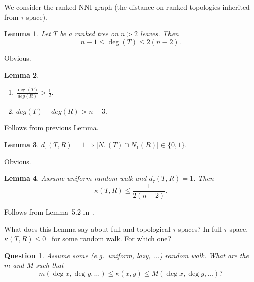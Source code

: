 \documentclass[12pt]{article}
\newtheorem{lemma}{Lemma}
\newtheorem{question}{Question}
\begin{document}
We consider the ranked-NNI graph (the distance on ranked topologies inherited from $\tau$-space). 

\begin{lemma}
Let $T$ be a ranked tree on $n>2$ leaves. Then \[n-1\leq \deg(T)\leq2(n-2).\] 
\end{lemma}

\proof
Obvious. 
\endproof

\begin{lemma}
\begin{enumerate}[(1)]
\item $\frac{\deg(T)}{deg(R)}>\frac12.$
\item $deg(T)-deg(R)> n-3.$
\end{enumerate}
\end{lemma}

\proof
Follows from previous Lemma. 
\endproof

\begin{lemma}
$d_{\tau}(T,R) = 1 \Rightarrow |N_1(T)\cap N_1(R)|\in\{0,1\}.$
\end{lemma}

\proof
Obvious.
\endproof

\begin{lemma}
Assume uniform random walk and $d_\tau(T,R) = 1$. Then \[\kappa(T,R) \leq \frac{1}{2(n-2)}.\]
\end{lemma}

\proof
Follows from Lemma~5.2 in~\cite{WhiddenMatsen}. 
\endproof

What does this Lemma say about full and topological $\tau$-spaces? In full $\tau$-space, $\kappa(T,R) \leq 0$~\cite{GD} for some random walk. For which one? 

\begin{question}
Assume some (e.g.\ uniform, lazy, ...) random walk. What are the $m$ and $M$ such that 
\[
m(\deg x,\deg y, \ldots) \leq \kappa(x,y) \leq M(\deg x, \deg y, \ldots)? 
\]
\end{question}
\end{document}
